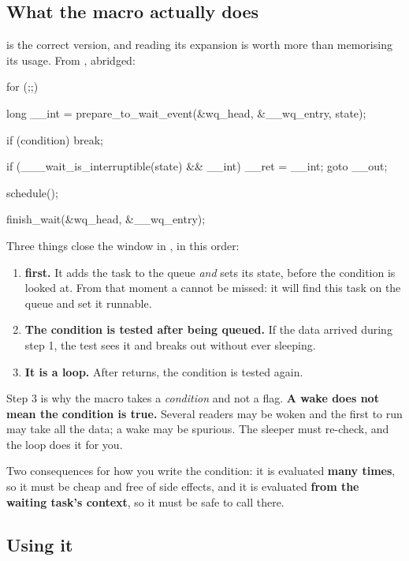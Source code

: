 \subsection{What the macro actually does}
\label{c9:app:a3}

 is the correct version, and reading its expansion is worth more than
memorising its usage. From , abridged:

\begin{ccode}
for (;;) {
        long __int = prepare_to_wait_event(&wq_head, &__wq_entry, state);

        if (condition)
                break;

        if (___wait_is_interruptible(state) && __int) {
                __ret = __int;
                goto __out;
        }

        schedule();
}
finish_wait(&wq_head, &__wq_entry);
\end{ccode}

\noindent Three things close the window in , in this order:
\begin{enumerate}
  \item \textbf{ first.} It adds the task to the queue \emph{and} sets
    its state, before the condition is looked at. From that moment a  cannot be
    missed: it will find this task on the queue and set it runnable.
  \item \textbf{The condition is tested after being queued.} If the data arrived during step 1, the
    test sees it and breaks out without ever sleeping.
  \item \textbf{It is a loop.} After  returns, the condition is tested again.
\end{enumerate}
Step 3 is why the macro takes a \emph{condition} and not a flag. \textbf{A wake does not mean the
condition is true.} Several readers may be woken and the first to run may take all the data; a wake
may be spurious. The sleeper must re-check, and the loop does it for you.

Two consequences for how you write the condition: it is evaluated \textbf{many times}, so it must be
cheap and free of side effects, and it is evaluated \textbf{from the waiting task's context}, so it
must be safe to call there.

\subsection{Using it}
\label{c9:app:a4}

